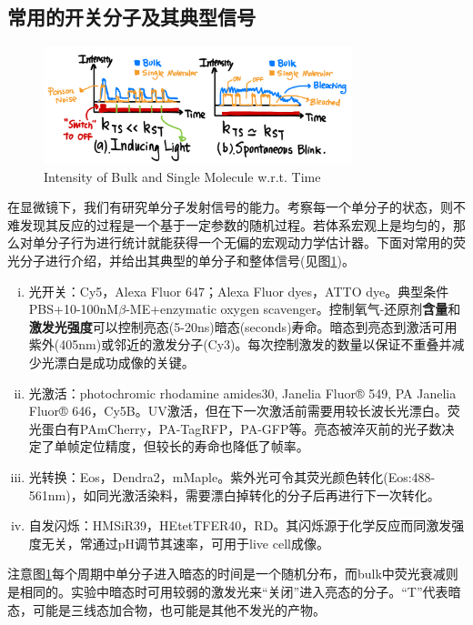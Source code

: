 \documentclass[12pt]{ctexart}%
\begin{document}
\subsection*{常用的开关分子及其典型信号}
\begin{figure}[b] %
    \centering
    \includegraphics[width=0.8\textwidth]{Dynamic_diagram.jpeg}
    \caption{Intensity of Bulk and Single Molecule w.r.t. Time}
    \label{Dynamic}
\end{figure}
在显微镜下，我们有研究单分子发射信号的能力。考察每一个单分子的状态，则不难发现其反应的过程是一个基于一定参数的随机过程。若体系宏观上是均匀的，那么对单分子行为进行统计就能获得一个无偏的宏观动力学估计器。下面对常用的荧光分子进行介绍，并给出其典型的单分子和整体信号(见图\ref{Dynamic})。
\begin{enumerate}[i)]
    \item 光开关：Cy5，Alexa Fluor 647；Alexa Fluor dyes，ATTO dye。典型条件PBS+10-100nM$\beta$-ME+enzymatic oxygen scavenger。控制氧气-还原剂\textbf{含量}和\textbf{激发光强度}可以控制亮态(5-20ns)暗态(seconds)寿命。暗态到亮态到激活可用紫外(405nm)或邻近的激发分子(Cy3)。每次控制激发的数量以保证不重叠并减少光漂白是成功成像的关键。
    \item 光激活：photochromic rhodamine amides30, Janelia Fluor® 549, PA Janelia Fluor® 646，Cy5B。UV激活，但在下一次激活前需要用较长波长光漂白。荧光蛋白有PAmCherry，PA-TagRFP，PA-GFP等。亮态被淬灭前的光子数决定了单帧定位精度，但较长的寿命也降低了帧率。
    \item 光转换：Eos，Dendra2，mMaple。紫外光可令其荧光颜色转化(Eos:488-561nm)，如同光激活染料，需要漂白掉转化的分子后再进行下一次转化。
    \item 自发闪烁：HMSiR39，HEtetTFER40，RD。其闪烁源于化学反应而同激发强度无关，常通过pH调节其速率，可用于live cell成像。
\end{enumerate}
注意图\ref{Dynamic}每个周期中单分子进入暗态的时间是一个随机分布，而bulk中荧光衰减则是相同的。实验中暗态时可用较弱的激发光来“关闭”进入亮态的分子。“T”代表暗态，可能是三线态加合物，也可能是其他不发光的产物。
\end{document}
